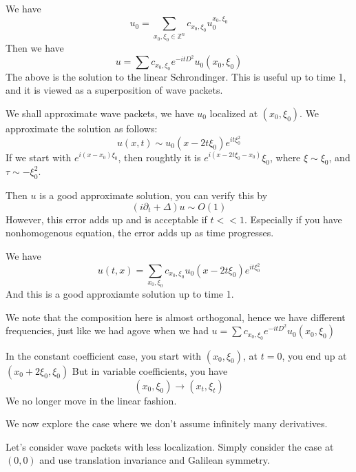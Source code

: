 We have
\begin{equation*}
    u_0=\sum_{x_0, \xi_0\in\mathbb{Z}^n}c_{x_0, \xi_0}u_0^{x_0, \xi_0}
\end{equation*}
Then we have
\begin{equation*}
    u=\sum c_{x_0, \xi_0}e^{-itD^2}u_0(x_0, \xi_0)
\end{equation*}
The above is the solution to the linear Schrondinger. This is useful up to time 1, and it is viewed as a superposition of wave packets.

We shall approximate wave packets, we have $u_0$ localized at $(x_0, \xi_0)$. We approximate the solution as follows:
\begin{equation*}
    u(x,t)\sim u_0(x-2t\xi_0)e^{it\xi_0^2}
\end{equation*}
If we start with $e^{i(x-x_0)\xi_0}$, then roughtly it is $e^{i(x-2t\xi_0-x_0)}\xi_0$, where $\xi\sim\xi_0$, and $\tau\sim-\xi_0^2$. 

Then $u$ is a good approximate solution, you can verify this by 
\begin{equation*}
    (i\partial_t+\Delta)u\sim O(1)
\end{equation*}
However, this error adds up and is acceptable if $t<< 1$. Especially if you have nonhomogenous equation, the error adds up as time progresses.

We have
\begin{equation*}
    u(t,x)=\sum_{x_0,\xi_0}c_{x_0, \xi_0}u_0(x-2t\xi_0)e^{it\xi_0^2}
\end{equation*}
And this is a good approxiamte solution up to time 1.

\begin{remark}
    We note that the composition here is almost orthogonal, hence we have different frequencies, just like we had agove when we had $u=\sum c_{x_0,\xi_0}e^{-itD^2}u_0(x_0, \xi_0)$
\end{remark}

In the constant coefficient case, you start with $(x_0, \xi_0)$, at $t=0$, you end up at $(x_0+2\xi_0, \xi_0)$
But in variable coefficients, you have
\begin{equation*}
    (x_0, \xi_0)\to (x_t, \xi_t)
\end{equation*}
We no longer move in the linear fashion.

We now explore the case where we don't assume infinitely many derivatives. 

Let's consider wave packets with less localization. Simply consider the case at $(0,0)$ and use translation invariance and Galilean symmetry.


